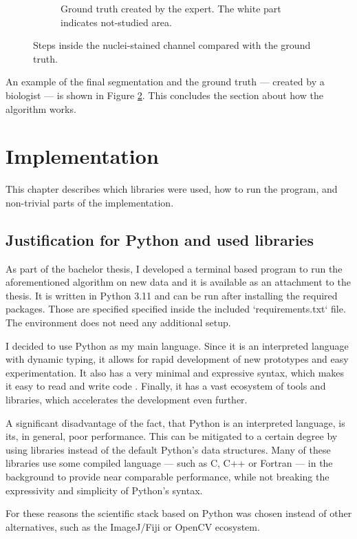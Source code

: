 \documentclass[
  digital,     %
  oneside,     %
  nosansbold,  %
  nocolorbold, %
  lof,         %
  lot,         %
]{fithesis4}
\begin{document}
\begin{figure}
\begin{subfigure}[t]{0.45\textwidth}
        \caption{Ground truth created by the expert. The white part indicates
        not-studied area.}
        \label{fig:ground-truth-crop}
    \end{subfigure}
    \caption{Steps inside the nuclei-stained channel compared with the ground
    truth.}
\end{figure}

An example of the final segmentation and the ground truth --- created by a
biologist --- is shown in Figure \ref{fig:ground-truth-crop}. This concludes the
section about how the algorithm works.

\chapter{Implementation}
This chapter describes which libraries were used, how to run the program, and
non-trivial parts of the implementation.

\section{Justification for Python and used libraries}
As part of the bachelor thesis, I developed a terminal based program to run the
aforementioned algorithm on new data and it is available as an attachment to the
thesis. It is written in Python 3.11 and can be run after installing the
required packages. Those are specified specified inside the included
`requirements.txt` file. The environment does not need any additional setup.

I decided to use Python as my main language. Since it is an interpreted language
with dynamic typing, it allows for rapid development of new prototypes and easy
experimentation. It also has a very minimal and expressive syntax, which makes
it easy to read and write code \cite{python-docs-tutorial}. Finally, it has a
vast ecosystem of tools and libraries, which accelerates the development even
further. 

A significant disadvantage of the fact, that Python is an interpreted language,
is its, in general, poor performance. This can be mitigated to a certain degree
by using libraries instead of the default Python's data structures. Many of
these libraries use some compiled language --- such as C, C++ or Fortran --- in
the background to provide near comparable performance, while not breaking
the expressivity and simplicity of Python's syntax.

For these reasons the scientific stack based on Python was chosen instead of
other alternatives, such as the ImageJ/Fiji or OpenCV ecosystem.
\end{document}
